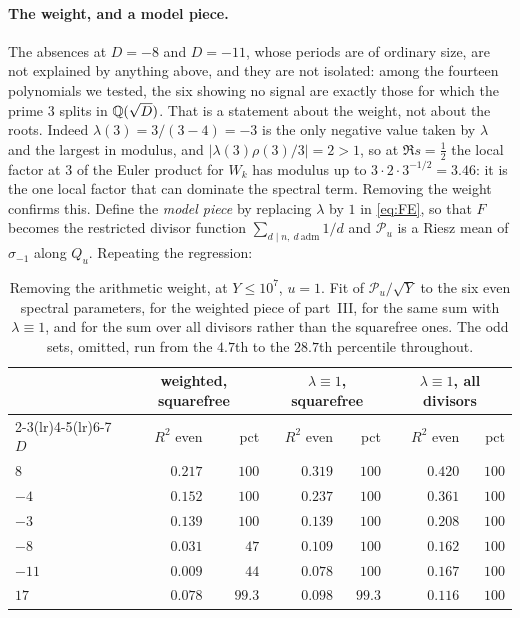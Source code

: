 \documentclass[11pt,a4paper]{article}
\theoremstyle{remark}\newtheorem{remark}[theorem]{Remark}
\begin{document}
\paragraph{The weight, and a model piece.} The absences at $D=-8$ and $D=-11$, whose periods are of ordinary size,
are not explained by anything above, and they are not isolated: among the fourteen polynomials we tested, the six
showing no signal are exactly those for which the prime $3$ splits in $\mathbb Q(\sqrt D)$. That is a statement about the
weight, not about the roots. Indeed $\lambda(3)=3/(3-4)=-3$ is the only negative value taken by $\lambda$ and the
largest in modulus, and $|\lambda(3)\rho(3)/3|=2>1$, so at $\Re s=\tfrac12$ the local factor at $3$ of the Euler
product for $W_k$ has modulus up to $3\cdot2\cdot3^{-1/2}=3.46$: it is the one local factor that can dominate the
spectral term. Removing the weight confirms this. Define the \emph{model piece} by replacing $\lambda$ by $1$ in
\eqref{eq:FE}, so that $F$ becomes the restricted divisor function $\sum_{d\mid n,\ d\ \mathrm{adm}}1/d$ and
$\mathcal P_u$ is a Riesz mean of $\sigma_{-1}$ along $Q_u$. Repeating the regression:

\begin{table}[htbp]
\centering\small
\caption{Removing the arithmetic weight, at $Y\le10^7$, $u=1$. Fit of $\mathcal P_u/\sqrt Y$ to the six even
spectral parameters, for the weighted piece of part~III, for the same sum with $\lambda\equiv1$, and for the sum over
all divisors rather than the squarefree ones. The odd sets, omitted, run from the $4.7$th to the $28.7$th percentile
throughout.}\label{tab:model}
\begin{tabular}{lrrrrrr}
\toprule
& \multicolumn{2}{c}{weighted, squarefree} & \multicolumn{2}{c}{$\lambda\equiv1$, squarefree} & \multicolumn{2}{c}{$\lambda\equiv1$, all divisors}\\
\cmidrule(lr){2-3}\cmidrule(lr){4-5}\cmidrule(lr){6-7}
$D$ & $R^2$ even & pct & $R^2$ even & pct & $R^2$ even & pct\\
\midrule
$8$   & $0.217$ & $100$  & $0.319$ & $100$  & $0.420$ & $100$\\
$-4$  & $0.152$ & $100$  & $0.237$ & $100$  & $0.361$ & $100$\\
$-3$  & $0.139$ & $100$  & $0.139$ & $100$  & $0.208$ & $100$\\
$-8$  & $0.031$ & $47$   & $0.109$ & $100$  & $0.162$ & $100$\\
$-11$ & $0.009$ & $44$   & $0.078$ & $100$  & $0.167$ & $100$\\
$17$  & $0.078$ & $99.3$ & $0.098$ & $99.3$ & $0.116$ & $100$\\
\bottomrule
\end{tabular}
\end{table}
\end{document}
